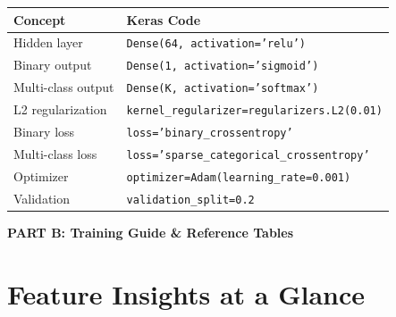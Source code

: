 \documentclass[11pt,a4paper]{article}
\begin{document}
\begin{examplebox}

\begin{tabular}{@{}l|l@{}}
\textbf{Concept} & \textbf{Keras Code} \\
\hline
Hidden layer & \texttt{Dense(64, activation='relu')} \\
Binary output & \texttt{Dense(1, activation='sigmoid')} \\
Multi-class output & \texttt{Dense(K, activation='softmax')} \\
L2 regularization & \texttt{kernel\_regularizer=regularizers.L2(0.01)} \\
Binary loss & \texttt{loss='binary\_crossentropy'} \\
Multi-class loss & \texttt{loss='sparse\_categorical\_crossentropy'} \\
Optimizer & \texttt{optimizer=Adam(learning\_rate=0.001)} \\
Validation & \texttt{validation\_split=0.2} \\
\end{tabular}
\end{examplebox}

\newpage


\begin{center}
\textbf{\LARGE PART B: Training Guide \& Reference Tables}
\end{center}
\vspace{1em}

\renewcommand{\thesection}{B.\arabic{section}}
\setcounter{section}{9}
\section{Feature Insights at a Glance}
\end{document}
